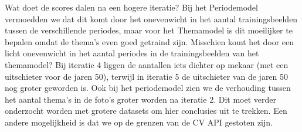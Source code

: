 Wat doet de scores dalen na een hogere iteratie? Bij het Periodemodel vermoedden we dat dit komt door het onevenwicht in het aantal trainingsbeelden tussen de verschillende periodes, maar voor het Themamodel is dit moeilijker te bepalen omdat de thema’s even goed getraind zijn. Misschien komt het door een licht onevenwicht in het aantal periodes in de trainingsbeelden van het themamodel? Bij iteratie 4 liggen de aantallen iets dichter op mekaar (met een uitschieter voor de jaren 50), terwijl in iteratie 5 de uitschieter van de jaren 50 nog groter geworden is. Ook bij het periodemodel zien we de verhouding tussen het aantal thema’s in de foto’s groter worden na iteratie 2. Dit moet verder onderzocht worden met grotere datasets om hier conclusies uit te trekken. Een andere mogelijkheid is dat we op de grenzen van de CV API gestoten zijn.
